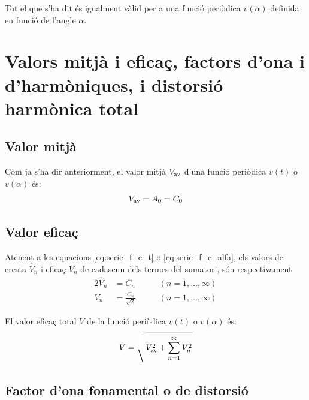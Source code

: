 Tot el que s'ha dit \'{e}s igualment v\`{a}lid per a una funci\'{o} peri\`{o}dica
$v(\alpha)$  definida en funci\'{o} de l'angle $\alpha$.


\section{Valors mitj\`{a} i efica\c{c}, factors d'ona i
d'harm\`{o}niques, i distorsi\'{o} harm\`{o}nica total}

\subsection{Valor mitj\`{a}}

Com ja s'ha dir anteriorment, el valor mitj\`{a} $V_\mathrm{av}$ d'una
funci\'{o} peri\`{o}dica $v(t)$ o $v(\alpha)$ \'{e}s:
\begin{equation}
    V_\mathrm{av} = A_0 = C_0
\end{equation}

\subsection{Valor efica\c{c}}

Atenent a les equacions  \eqref{eq:serie_f_c_t} o
\eqref{eq:serie_f_c_alfa}, els valors de cresta $\hat{V}_n$ i efica\c{c}
$V_n$ de cadascun dels termes del sumatori, s\'{o}n respectivament
\begin{alignat}{2}
    \hat{V}_n &= C_n &\qquad(n=1,\ldots,\infty)\\[0.5ex]
    V_n &= \frac{C_n}{\sqrt{2}} &\qquad(n=1,\ldots,\infty)
\end{alignat}

El valor efica\c{c} total $V$ de  la funci\'{o} peri\`{o}dica $v(t)$ o
$v(\alpha)$ \'{e}s:
\begin{equation}
    V = \sqrt{V_\mathrm{av}^2 + \sum_{n=1}^{\infty}V^2_n} \label{eq:val_ef_fourier}
\end{equation}

\subsection{Factor d'ona fonamental o de distorsi\'{o}}

